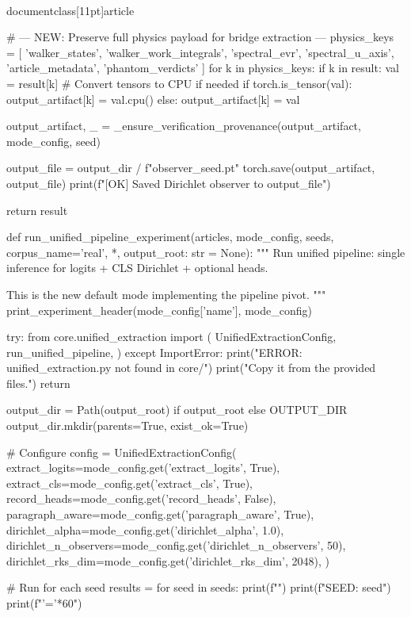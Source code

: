 \\documentclass[11pt]{article}
\begin{document}
\begin{CodeBlock}
        # --- NEW: Preserve full physics payload for bridge extraction ---
        physics_keys = [
            'walker_states', 'walker_work_integrals', 
            'spectral_evr', 'spectral_u_axis', 
            'article_metadata', 'phantom_verdicts'
        ]
        for k in physics_keys:
            if k in result:
                val = result[k]
                # Convert tensors to CPU if needed
                if torch.is_tensor(val):
                    output_artifact[k] = val.cpu()
                else:
                    output_artifact[k] = val
        
        output_artifact, _ = _ensure_verification_provenance(output_artifact, mode_config, seed)
        
        output_file = output_dir / f"observer_{seed}.pt"
        torch.save(output_artifact, output_file)
        print(f"[OK] Saved Dirichlet observer to {output_file}")
    
    return result


def run_unified_pipeline_experiment(articles, mode_config, seeds, corpus_name='real', *, output_root: str = None):
    """
    Run unified pipeline: single inference for logits + CLS Dirichlet + optional heads.
    
    This is the new default mode implementing the pipeline pivot.
    """
    print_experiment_header(mode_config['name'], mode_config)
    
    try:
        from core.unified_extraction import (
            UnifiedExtractionConfig,
            run_unified_pipeline,
        )
    except ImportError:
        print("ERROR: unified_extraction.py not found in core/")
        print("Copy it from the provided files.")
        return {}
    
    output_dir = Path(output_root) if output_root else OUTPUT_DIR
    output_dir.mkdir(parents=True, exist_ok=True)
    
    # Configure
    config = UnifiedExtractionConfig(
        extract_logits=mode_config.get('extract_logits', True),
        extract_cls=mode_config.get('extract_cls', True),
        record_heads=mode_config.get('record_heads', False),
        paragraph_aware=mode_config.get('paragraph_aware', True),
        dirichlet_alpha=mode_config.get('dirichlet_alpha', 1.0),
        dirichlet_n_observers=mode_config.get('dirichlet_n_observers', 50),
        dirichlet_rks_dim=mode_config.get('dirichlet_rks_dim', 2048),
    )
    
    # Run for each seed
    results = {}
    for seed in seeds:
        print(f"")
        print(f"SEED: {seed}")
        print(f"{'='*60}")
        

\end{CodeBlock}
\end{document}
